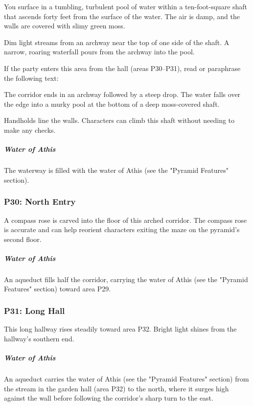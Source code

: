 \documentclass[10pt,a4paper,twoside,bg=print,twocolumn,openany,nodeprecatedcode]{dndbook}
\begin{document}
\begin{DndReadAloud}{}
You surface in a tumbling, turbulent pool of water within a ten-foot-square shaft that ascends forty feet from the surface of the water. The air is damp, and the walls are covered with slimy green moss.

Dim light streams from an archway near the top of one side of the shaft. A narrow, roaring waterfall pours from the archway into the pool.

\end{DndReadAloud}

If the party enters this area from the hall (areas P30–P31), read or paraphrase the following text:

\begin{DndReadAloud}{}
The corridor ends in an archway followed by a steep drop. The water falls over the edge into a murky pool at the bottom of a deep moss-covered shaft.

\end{DndReadAloud}

Handholds line the walls. Characters can climb this shaft without needing to make any checks.

\subparagraph{Water of Athis}
The waterway is filled with the water of Athis (see the "Pyramid Features" section).

\subsubsection{P30: North Entry}
A compass rose is carved into the floor of this arched corridor. The compass rose is accurate and can help reorient characters exiting the maze on the pyramid's second floor.

\subparagraph{Water of Athis}
An aqueduct fills half the corridor, carrying the water of Athis (see the "Pyramid Features" section) toward area P29.

\subsubsection{P31: Long Hall}
This long hallway rises steadily toward area P32. Bright light shines from the hallway's southern end.

\subparagraph{Water of Athis}
An aqueduct carries the water of Athis (see the "Pyramid Features" section) from the stream in the garden hall (area P32) to the north, where it surges high against the wall before following the corridor's sharp turn to the east.
\end{document}
